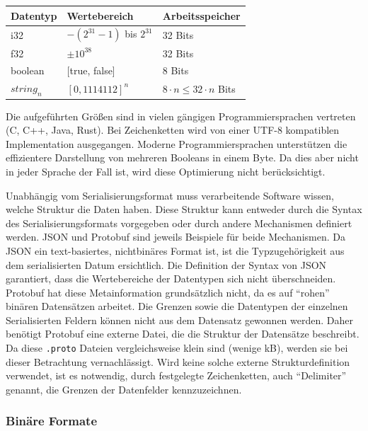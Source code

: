 \documentclass[ngerman]{seminarvorlage}
\begin{document}
\begin{table}[h]
  \centering
  \begin{tabular}{|l|l|l|} 
  \hline
  Datentyp  & Wertebereich               & Arbeitsspeicher                    \\ 
  \hline
  i32         & $-\left(2^{31}-1\right)$ bis $2^{31}$  & 32 Bits              \\
  f32         & $\pm 10^{38}$              & 32 Bits                          \\
  boolean     & {[}true, false]            & 8 Bits                           \\
  $string_n$  & $[0, 1114112]^n$           & $8 \cdot n \leq 32 \cdot n$ Bits \\
  \hline
  \end{tabular}
\end{table}

Die aufgeführten Größen sind in vielen gängigen Programmiersprachen vertreten (C, C++, Java, Rust). Bei Zeichenketten wird von einer UTF-8 kompatiblen Implementation ausgegangen. Moderne Programmiersprachen unterstützen die effizientere Darstellung von mehreren Booleans in einem Byte. Da dies aber nicht in jeder Sprache der Fall ist, wird diese Optimierung nicht berücksichtigt.

Unabhängig vom Serialisierungsformat muss verarbeitende Software wissen, welche Struktur die Daten haben. Diese Struktur kann entweder durch die Syntax des Serialisierungsformats vorgegeben oder durch andere Mechanismen definiert werden. JSON und Protobuf sind jeweils Beispiele für beide Mechanismen. Da JSON ein text-basiertes, nichtbinäres Format ist, ist die Typzugehörigkeit aus dem serialisierten Datum ersichtlich. Die Definition der Syntax von JSON garantiert, dass die Wertebereiche der Datentypen sich nicht überschneiden. Protobuf hat diese Metainformation grundsätzlich nicht, da es auf ``rohen'' binären Datensätzen arbeitet. Die Grenzen sowie die Datentypen der einzelnen Serialisierten Feldern können nicht aus dem Datensatz gewonnen werden. Daher benötigt Protobuf eine externe Datei, die die Struktur der Datensätze beschreibt. Da diese \texttt{.proto} Dateien vergleichsweise klein sind (wenige kB), werden sie bei dieser Betrachtung vernachlässigt. Wird keine solche externe Strukturdefinition verwendet, ist es notwendig, durch festgelegte Zeichenketten, auch ``Delimiter'' genannt, die Grenzen der Datenfelder kennzuzeichnen.

\subsubsection{Binäre Formate}
\end{document}
